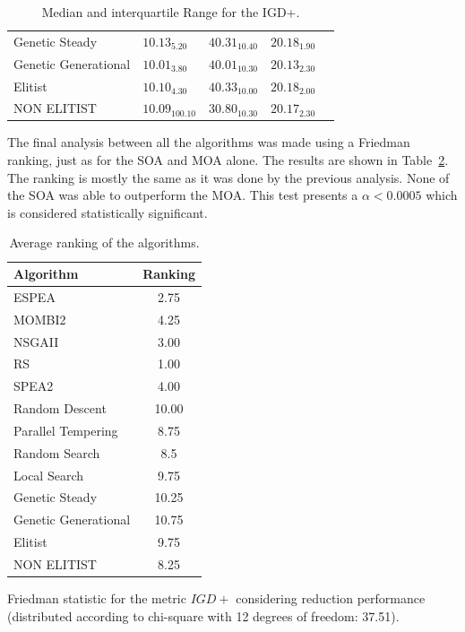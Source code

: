 \begin{table}[H]
{\begin{tabular}{lllll}
    Genetic Steady       & $  10.13_{5.20}$                   & $  40.31_{ 10.40}$                   & $  20.18_{1.90}$                 \\
    Genetic Generational & $  10.01_{3.80}$                   & $  40.01_{ 10.30}$                   & $  20.13_{2.30}$                 \\
    Elitist              & $  10.10_{4.30}$                   & $  40.33_{ 10.00}$                   & $  20.18_{2.00}$                 \\
    NON ELITIST          & $  10.09_{100.10}$                 & $  30.80_{ 10.30}$                   & $  20.17_{2.30}$                 \\                
    \hline
    \end{tabular}%
    }
    \caption{Median and interquartile Range for the IGD+.}
    \label{tab:me_int_both_igdp}
\end{table}

The final analysis between all the algorithms was made using a Friedman ranking, just as for the SOA and MOA alone. The results are shown in Table~\ref{tab:fried_both_igdp}. The ranking is mostly the same as it was done by the previous analysis. None of the SOA was able to outperform the MOA. This test presents a $\alpha < 0.0005$ which is considered statistically significant.


\begin{table}[H]
    \centering
    \begin{threeparttable}
    \begin{tabular}{lc}
    \hline
    Algorithm&Ranking\\
    \hline
    ESPEA&2.75\\
    MOMBI2&4.25\\
    NSGAII&3.00\\
    RS&1.00\\
    SPEA2&4.00\\
    Random Descent&10.00\\
    Parallel Tempering&8.75\\
    Random Search&8.5\\
    Local Search&9.75\\
    Genetic Steady&10.25\\
    Genetic Generational&10.75\\
    Elitist&9.75\\
    NON ELITIST&8.25\\
    \hline
    \end{tabular}
    \begin{tablenotes}
        \small
        \item Friedman statistic for the metric $IGD+$  considering reduction performance (distributed according to chi-square with 12 degrees of freedom: 37.51).\\
    \end{tablenotes}
    \end{threeparttable}
    \caption{Average ranking of the algorithms.}
    \label{tab:fried_both_igdp}
\end{table}

